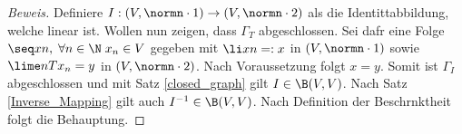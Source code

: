 
\begin{proof}[Beweis]
	Definiere \(I: (V,\normn\cdot1) \to (V,\normn\cdot 2)\) als die Identit\as tabbildung, welche linear ist. Wollen nun zeigen, dass \(\Gamma_T\) abgeschlossen. Sei daf\us r eine Folge \(\seq xn, \;\forall n \in \N\; x_n \in V\) gegeben mit \(\li xn =: x\) in \((V,\normn\cdot 1)\) sowie \(\lime n Tx_n = y\) in \((V,\normn\cdot 2)\). Nach Voraussetzung folgt \(x = y\). Somit ist \(\Gamma_I\) abgeschlossen und mit Satz \ref{closed_graph} gilt \(I \in \B(V,V)\). Nach Satz \ref{Inverse_Mapping} gilt auch \(I^{-1} \in \B(V,V)\). Nach Definition der Beschr\as nktheit folgt die Behauptung.
\end{proof}